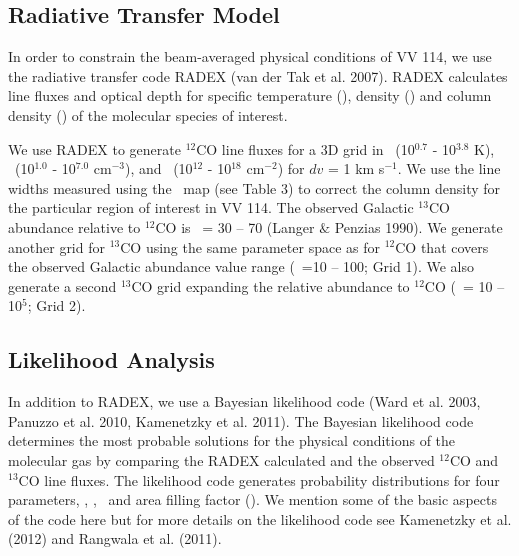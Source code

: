 \subsection{Radiative Transfer Model} %
In order to constrain the beam-averaged physical conditions of VV 114, we use the radiative transfer code RADEX (van der Tak et al. 2007). RADEX calculates line fluxes and optical depth for specific temperature (\tkin), density (\nhtwo) and column density (\nmol) of the molecular species of interest. 

We use RADEX to generate $^{12}$CO line fluxes for a 3D grid in \tkin\ (10$^{0.7}$ - 10$^{3.8}$ K), \nhtwo\ (10$^{1.0}$ - 10$^{7.0}$ cm$^{-3}$), and \nco\ (10$^{12}$ - 10$^{18}$ cm$^{-2}$) for $dv$ = 1 km s$^{-1}$. We use the line widths measured using the \cothree\ map (see Table 3) to correct the column density for the particular region of interest in VV 114. The observed Galactic $^{13}$CO abundance relative to $^{12}$CO is \xco\ = 30 -- 70 (Langer $\&$ Penzias 1990)\nocite{1990ApJ...357..477L}. We generate another grid for $^{13}$CO using the same parameter space as for $^{12}$CO that covers the observed Galactic abundance value range (\xco\ =10 -- 100; Grid 1). We also generate a second $^{13}$CO grid expanding the relative abundance to $^{12}$CO (\xco\ = 10 -- 10$^{5}$; Grid 2). 


\subsection{Likelihood Analysis}%
In addition to RADEX, we use a Bayesian likelihood code (Ward et al. 2003, Panuzzo et al. 2010, Kamenetzky et al. 2011)\nocite{2010A&A...518L..37P}\nocite{2003ApJ...587..171W}\nocite{2011ApJ...731...83K}. The Bayesian likelihood code determines the most probable solutions for the physical conditions of the molecular gas by comparing the RADEX  calculated and the observed $^{12}$CO and $^{13}$CO line fluxes. The likelihood code generates probability distributions for four parameters,  \tkin ,  \nhtwo ,  \nco\ and area filling factor (\ff). We mention some of the basic aspects of the code here but for more details on the likelihood code see Kamenetzky et al. (2012)\nocite{2012ApJ...753...70K} and Rangwala et al. (2011). 

